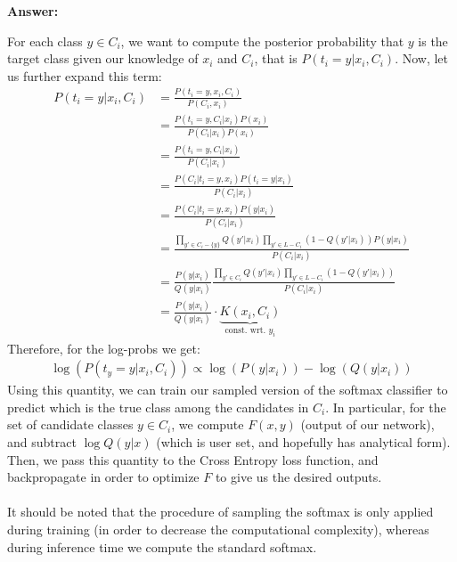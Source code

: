 \documentclass{article}
\newenvironment{QandA}{\begin{enumerate}[label=\arabic*.]}{\end{enumerate}}
\newenvironment{ListAlph}{\begin{enumerate}[label=(\alph*)]}{\end{enumerate}}
\newenvironment{answer}{\par\normalfont \textbf{Answer:}}{}
\newcommand{\g}{\vert}
\begin{document}
\begin{QandA}
\begin{answer}
\begin{ListAlph}
            For each class $y \in C_i$, we want to compute the posterior probability that $y$ is the target class given our knowledge of $x_i$ and $C_i$, that is $P(t_i = y \g x_i, C_i)$. Now, let us further expand this term:
            \begin{align*}
                P(t_i = y \g x_i, C_i) &= \frac{P(t_i = y, x_i, C_i)}{P(C_i, x_i)} \\
                &= \frac{P(t_i = y, C_i \g x_i) P(x_i)}{P(C_i \g x_i) P(x_i)} \\
                &= \frac{P(t_i = y, C_i \g x_i)}{P(C_i \g x_i)} \\
                &= \frac{P(C_i \g t_i = y, x_i) P(t_i = y \g x_i)}{P(C_i \g x_i)} \\
                &= \frac{P(C_i \g t_i = y, x_i) P(y \g x_i)}{P(C_i \g x_i)} \\
                &= \frac{\displaystyle \prod_{y' \in C_i - \{y\}} Q(y' \g x_i) \prod_{y' \in L - C_i} (1 - Q(y' \g x_i)) P(y \g x_i) }{P(C_i \g x_i)} \\
                &= \frac{P(y \g x_i)}{Q(y \g x_i)} \frac{\displaystyle \prod_{y' \in C_i } Q(y' \g x_i) \prod_{y' \in L - C_i} (1 - Q(y' \g x_i)) }{P(C_i \g x_i)} \\
                &= \frac{P(y \g x_i)}{Q(y \g x_i)} \cdot \underbrace{K(x_i, C_i)}_{\text{const. wrt. } y_i}
            \end{align*} 
            Therefore, for the log-probs we get:
            \begin{align*}
                \log (P(t_y = y \g x_i, C_i)) \propto \log (P(y \g x_i)) - \log (Q(y \g x_i)) 
            \end{align*}
            Using this quantity, we can train our sampled version of the softmax classifier to predict which is the true class among the candidates in $C_i$. In particular, for the set of candidate classes $y \in C_i$, we compute $F(x, y)$ (output of our network), and subtract $\log Q(y \g x)$ (which is user set, and hopefully has analytical form). Then, we pass this quantity to the Cross Entropy loss function, and backpropagate in order to optimize $F$ to give us the desired outputs. \\\\
            It should be noted that the procedure of sampling the softmax is only applied during training (in order to decrease the computational complexity), whereas during inference time we compute the standard softmax.


\end{ListAlph}
\end{answer}
\end{QandA}
\end{document}
